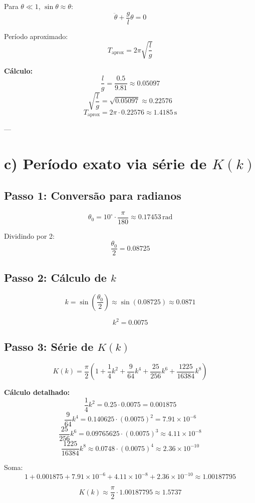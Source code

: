 \documentclass[12pt]{article}
\begin{document}
Para \(\theta \ll 1\), \(\sin\theta \approx \theta\):
\[
\ddot{\theta} + \frac{g}{l} \theta = 0
\]

Período aproximado:
\[
T_\text{aprox} = 2 \pi \sqrt{\frac{l}{g}}
\]

\textbf{Cálculo:}
\[
\frac{l}{g} = \frac{0.5}{9.81} \approx 0.05097
\]
\[
\sqrt{\frac{l}{g}} = \sqrt{0.05097} \approx 0.22576
\]
\[
T_\text{aprox} = 2 \pi \cdot 0.22576 \approx 1.4185\,\text{s}
\]

---

\section*{c) Período exato via série de \(K(k)\)}

\subsection*{Passo 1: Conversão para radianos}

\[
\theta_0 = 10^\circ \cdot \frac{\pi}{180} \approx 0.17453\,\text{rad}
\]

Dividindo por 2:
\[
\frac{\theta_0}{2} = 0.08725
\]

\subsection*{Passo 2: Cálculo de \(k\)}

\[
k = \sin\left(\frac{\theta_0}{2}\right) \approx \sin(0.08725) \approx 0.0871
\]

\[
k^2 = 0.0075
\]

\subsection*{Passo 3: Série de \(K(k)\)}

\[
K(k) = \frac{\pi}{2} \left( 1 + \frac{1}{4} k^2 + \frac{9}{64} k^4 + \frac{25}{256} k^6 + \frac{1225}{16384} k^8 \right)
\]

\textbf{Cálculo detalhado:}
\[
\frac{1}{4} k^2 = 0.25 \cdot 0.0075 = 0.001875
\]
\[
\frac{9}{64} k^4 = 0.140625 \cdot (0.0075)^2 = 7.91 \times 10^{-6}
\]
\[
\frac{25}{256} k^6 = 0.09765625 \cdot (0.0075)^3 \approx 4.11 \times 10^{-8}
\]
\[
\frac{1225}{16384} k^8 \approx 0.0748 \cdot (0.0075)^4 \approx 2.36 \times 10^{-10}
\]

Soma:
\[
1 + 0.001875 + 7.91\times10^{-6} + 4.11 \times 10^{-8} + 2.36\times10^{-10} \approx 1.00187795
\]

\[
K(k) \approx \frac{\pi}{2} \cdot 1.00187795 \approx 1.5737
\]
\end{document}
